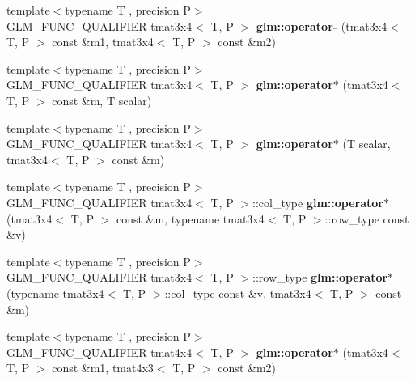 \begin{DoxyCompactItemize}
\item 
\mbox{\label{type__mat3x4_8inl_a6349098541c329f41e900eaf05eca9f7}} 
{\footnotesize template$<$typename T , precision P$>$ }\\G\+L\+M\+\_\+\+F\+U\+N\+C\+\_\+\+Q\+U\+A\+L\+I\+F\+I\+ER tmat3x4$<$ T, P $>$ {\bfseries glm\+::operator-\/} (tmat3x4$<$ T, P $>$ const \&m1, tmat3x4$<$ T, P $>$ const \&m2)
\item 
\mbox{\label{type__mat3x4_8inl_af562832610ccb7812350eb27d030f454}} 
{\footnotesize template$<$typename T , precision P$>$ }\\G\+L\+M\+\_\+\+F\+U\+N\+C\+\_\+\+Q\+U\+A\+L\+I\+F\+I\+ER tmat3x4$<$ T, P $>$ {\bfseries glm\+::operator$\ast$} (tmat3x4$<$ T, P $>$ const \&m, T scalar)
\item 
\mbox{\label{type__mat3x4_8inl_a1507aacde18cb881f8a7188905cc31dd}} 
{\footnotesize template$<$typename T , precision P$>$ }\\G\+L\+M\+\_\+\+F\+U\+N\+C\+\_\+\+Q\+U\+A\+L\+I\+F\+I\+ER tmat3x4$<$ T, P $>$ {\bfseries glm\+::operator$\ast$} (T scalar, tmat3x4$<$ T, P $>$ const \&m)
\item 
\mbox{\label{type__mat3x4_8inl_acfc37201cc87201be4ee62163b920f60}} 
{\footnotesize template$<$typename T , precision P$>$ }\\G\+L\+M\+\_\+\+F\+U\+N\+C\+\_\+\+Q\+U\+A\+L\+I\+F\+I\+ER tmat3x4$<$ T, P $>$\+::col\+\_\+type {\bfseries glm\+::operator$\ast$} (tmat3x4$<$ T, P $>$ const \&m, typename tmat3x4$<$ T, P $>$\+::row\+\_\+type const \&v)
\item 
\mbox{\label{type__mat3x4_8inl_a07073085876a06ecf12abfa2cea3c054}} 
{\footnotesize template$<$typename T , precision P$>$ }\\G\+L\+M\+\_\+\+F\+U\+N\+C\+\_\+\+Q\+U\+A\+L\+I\+F\+I\+ER tmat3x4$<$ T, P $>$\+::row\+\_\+type {\bfseries glm\+::operator$\ast$} (typename tmat3x4$<$ T, P $>$\+::col\+\_\+type const \&v, tmat3x4$<$ T, P $>$ const \&m)
\item 
\mbox{\label{type__mat3x4_8inl_a2e36bbd84745c2cd6dee14d589a152dc}} 
{\footnotesize template$<$typename T , precision P$>$ }\\G\+L\+M\+\_\+\+F\+U\+N\+C\+\_\+\+Q\+U\+A\+L\+I\+F\+I\+ER tmat4x4$<$ T, P $>$ {\bfseries glm\+::operator$\ast$} (tmat3x4$<$ T, P $>$ const \&m1, tmat4x3$<$ T, P $>$ const \&m2)

\end{DoxyCompactItemize}
